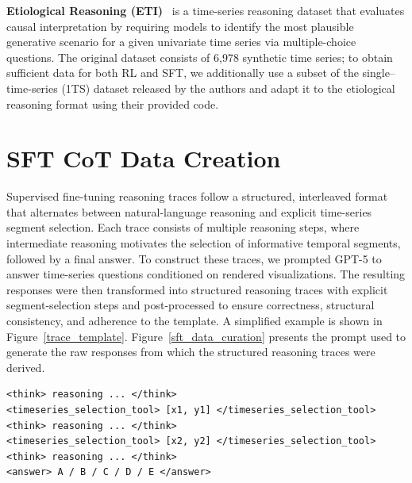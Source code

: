 \textbf{Etiological Reasoning (ETI)}~\cite{merrill2024tsandlang} is a time-series reasoning dataset that evaluates causal interpretation by requiring models to identify the most plausible generative scenario for a given univariate time series via multiple-choice questions. The original dataset consists of 6,978 synthetic time series; to obtain sufficient data for both RL and SFT, we additionally use a subset of the single–time-series (1TS) dataset released by the authors and adapt it to the etiological reasoning format using their provided code.

\section{SFT CoT Data Creation}
\label{app:sft_cot_data}
Supervised fine-tuning reasoning traces follow a structured, interleaved format that alternates between natural-language reasoning and explicit time-series segment selection. Each trace consists of multiple reasoning steps, where intermediate reasoning motivates the selection of informative temporal segments, followed by a final answer.
To construct these traces, we prompted GPT-5 to answer time-series questions conditioned on rendered visualizations. The resulting responses were then transformed into structured reasoning traces with explicit segment-selection steps and post-processed to ensure correctness, structural consistency, and adherence to the template.
A simplified example is shown in Figure~\ref{trace_template}. Figure~\ref{sft_data_curation} presents the prompt used to generate the raw responses from which the structured reasoning traces were derived.



\begin{center}
\label{trace_template}
\begin{tcolorbox}[
        breakable,          
        colback=gray!5,    
        colframe=black, 
        arc=2mm,  
        boxrule=0.5pt,
        fontupper=\footnotesize
    ]
\begin{Verbatim}[fontsize=\footnotesize]
<think> reasoning ... </think>
<timeseries_selection_tool> [x1, y1] </timeseries_selection_tool>
<think> reasoning ... </think>
<timeseries_selection_tool> [x2, y2] </timeseries_selection_tool>
<think> reasoning ... </think>
<answer> A / B / C / D / E </answer>
\end{Verbatim}
\end{tcolorbox}
\end{center}

